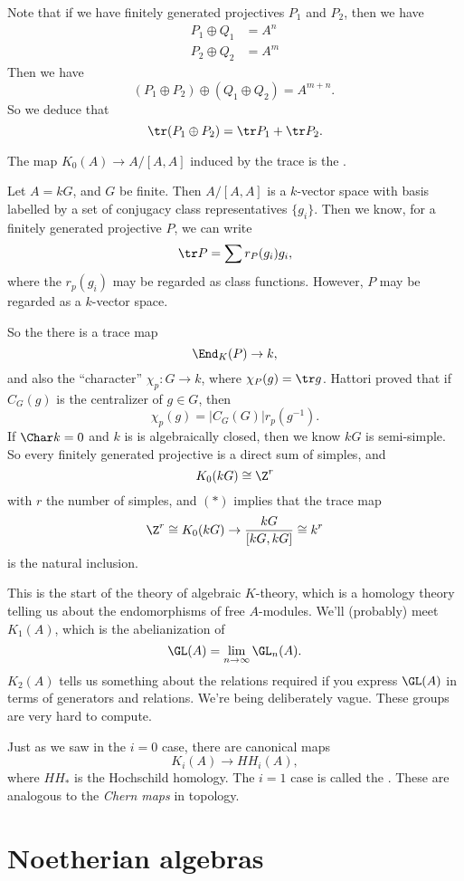 \documentclass[a4paper]{article}
\newcommand\HH{H\!H}
\begin{document}
Note that if we have finitely generated projectives $P_1$ and $P_2$, then we have
\begin{align*}
  P_1 \oplus Q_1 &= A^n\\
  P_2 \oplus Q_2 &= A^m
\end{align*}
Then we have
\[
  (P_1 \oplus P_2) \oplus (Q_1 \oplus Q_2) = A^{m + n}.\
\]
So we deduce that
\[
  \tr (P_1 \oplus P_2) = \tr P_1 + \tr P_2.
\]
\begin{defi}
  The map $K_0(A) \to A/[A, A]$ induced by the trace is the .
\end{defi}

\begin{eg}
  Let $A = kG$, and $G$ be finite. Then $A/[A, A]$ is a $k$-vector space with basis labelled by a set of conjugacy class representatives $\{g_i\}$. Then we know, for a finitely generated projective $P$, we can write
  \[
    \tr P = \sum r_P(g_i) g_i,
  \]
  where the $r_p(g_i)$ may be regarded as class functions. However, $P$ may be regarded as a $k$-vector space.

  So the there is a trace map
  \[
    \End_K(P) \to k,
  \]
  and also the ``character'' $\chi_p: G \to k$, where $\chi_P(g) = \tr g$. Hattori proved that if $C_G(g)$ is the centralizer of $g \in G$, then
  \[
    \chi_p(g) = |C_G(G)| r_p(g^{-1}).\tag{$*$}
  \]
  If $\Char k = 0$ and $k$ is is algebraically closed, then we know $kG$ is semi-simple. So every finitely generated projective is a direct sum of simples, and
  \[
    K_0(kG) \cong \Z^r
  \]
  with $r$ the number of simples, and $(*)$ implies that the trace map
  \[
    \Z^r \cong K_0(kG) \to \frac{kG}{[kG, kG]} \cong k^r
  \]
  is the natural inclusion.
\end{eg}
This is the start of the theory of algebraic $K$-theory, which is a homology theory telling us about the endomorphisms of free $A$-modules. We'll (probably) meet $K_1(A)$, which is the abelianization of
\[
  \GL(A) = \lim_{n \to \infty} \GL_n(A).
\]
$K_2(A)$ tells us something about the relations required if you express $\GL(A)$ in terms of generators and relations. We're being deliberately vague. These groups are very hard to compute.

Just as we saw in the $i = 0$ case, there are canonical maps
\[
  K_i(A) \to \HH_i(A),
\]
where $\HH_*$ is the Hochschild homology. The $i = 1$ case is called the . These are analogous to the \emph{Chern maps} in topology.

\section{Noetherian algebras}
\end{document}
